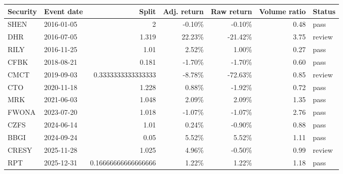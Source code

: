 \begin{tabular}{@{}llrrrrl@{}}
\toprule
Security & Event date & Split & Adj. return & Raw return & Volume ratio & Status \\
\midrule
SHEN & 2016-01-05 & 2 & -0.10\% & -0.10\% & 0.48 & pass \\
DHR & 2016-07-05 & 1.319 & 22.23\% & -21.42\% & 3.75 & review \\
RILY & 2016-11-25 & 1.01 & 2.52\% & 1.00\% & 0.27 & pass \\
CFBK & 2018-08-21 & 0.181 & -1.70\% & -1.70\% & 0.60 & pass \\
CMCT & 2019-09-03 & 0.3333333333333333 & -8.78\% & -72.63\% & 0.85 & review \\
CTO & 2020-11-18 & 1.228 & 0.88\% & -1.92\% & 0.72 & pass \\
MRK & 2021-06-03 & 1.048 & 2.09\% & 2.09\% & 1.35 & pass \\
FWONA & 2023-07-20 & 1.018 & -1.07\% & -1.07\% & 2.76 & pass \\
CZFS & 2024-06-14 & 1.01 & 0.24\% & -0.90\% & 0.88 & pass \\
BBGI & 2024-09-24 & 0.05 & 5.52\% & 5.52\% & 1.11 & pass \\
CRESY & 2025-11-28 & 1.025 & 4.96\% & -0.50\% & 0.99 & review \\
RPT & 2025-12-31 & 0.16666666666666666 & 1.22\% & 1.22\% & 1.18 & pass \\
\bottomrule
\end{tabular}
